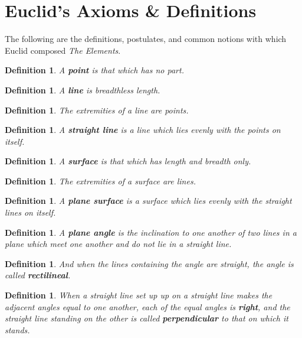 \documentclass[letterpaper, 12pt]{amsart}
\newtheorem{defn}[thm]{Definition}
\theoremstyle{definition}  %
\begin{document}
	\section{Euclid's Axioms \& Definitions}
	\label{sec:euclid_s_axioms_&_definitions}
	The following are the definitions, postulates, and common notions with which Euclid composed \textit{The Elements}.

		\begin{defn}
		A \textbf{point} is that which has no part.
		\end{defn}

		\begin{defn}
		A \textbf{line} is breadthless length.
		\end{defn}

		\begin{defn}
		The extremities of a line are points.
		\end{defn}

		\begin{defn}
		A \textbf{straight line} is a line which lies evenly with the points on itself.
		\end{defn}

		\begin{defn}
		A \textbf{surface} is that which has length and breadth only.
		\end{defn}

		\begin{defn}
		The extremities of a surface are lines.
		\end{defn}

		\begin{defn}
		A \textbf{plane surface} is a surface which lies evenly with the straight lines on itself.
		\end{defn}

		\begin{defn}
		A \textbf{plane angle} is the inclination to one another of two lines in a plane which meet one another and do not lie in a straight line.
		\end{defn}

		\begin{defn}
		And when the lines containing the angle are straight, the angle is called \textbf{rectilineal}.
		\end{defn}

		\begin{defn}
		When a straight line set up up on a straight line makes the adjacent angles equal to one another, each of the equal angles is \textbf{right}, and the straight line standing on the other is called \textbf{perpendicular} to that on which it stands.
		\end{defn}
\end{document}
